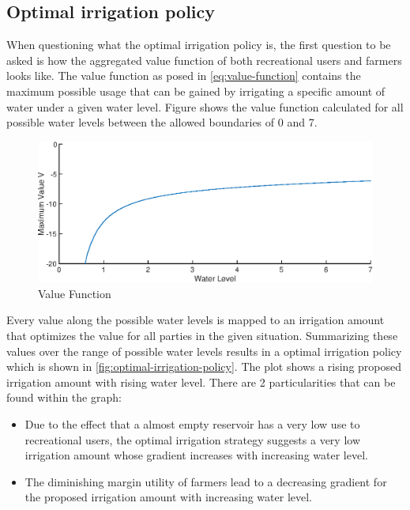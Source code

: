 \documentclass[12pt, a4paper, oneside]{article}
\begin{document}
\subsection{Optimal irrigation policy}
When questioning what the optimal irrigation policy is, the first question to be asked is how the aggregated value function of both recreational users and farmers looks like.
The value function as posed in \ref{eq:value-function} contains the maximum possible usage that can be gained by irrigating a specific amount of water under a given water level. 
Figure  shows the value function calculated for all possible water levels between the allowed boundaries of 0 and 7. 
\begin{figure}[ht]
	\includegraphics[width=1\textwidth]{figures/value_function.eps}
	\caption{Value Function}
	\label{fig:value-function}
\end{figure}
\newline
Every value along the possible water levels is mapped to an irrigation amount that optimizes the value for all parties in the given situation. Summarizing these values over the range of possible water levels results in a optimal irrigation policy which is shown in \ref{fig:optimal-irrigation-policy}.
The plot shows a rising proposed irrigation amount with rising water level. There are 2 particularities that can be found within the graph:
\begin{itemize}
	\item Due to the effect that a almost empty reservoir has a very low use to recreational users, the optimal irrigation strategy suggests a very low irrigation amount whose gradient increases with increasing water level.
	\item The diminishing margin utility of farmers lead to a decreasing gradient for the proposed irrigation amount with increasing water level.
\end{itemize}
\end{document}
